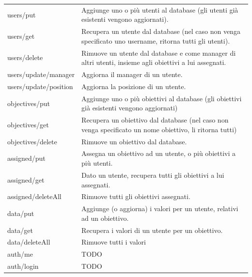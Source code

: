 \begin{table}[]
    \begin{tabular}{ll}
    users/put             & Aggiunge uno o più utenti al database (gli utenti già esistenti vengono aggiornati).                     \\
    users/get             & Recupera un utente dal database (nel caso non venga specificato uno username, ritorna tutti gli utenti). \\
    users/delete          & Rimuove un utente dal database e come manager di altri utenti, insieme agli obiettivi a lui assegnati.   \\
    users/update/manager  & Aggiorna il manager di un utente.                                                                        \\
    users/update/position & Aggiorna la posizione di un utente.                                                                      \\
    objectives/put        & Aggiunge uno o più obiettivi al database (gli obiettivi già esistenti vengono aggiornati)                \\
    objectives/get        & Recupera un obiettivo dal database (nel caso non venga specificato un nome obiettivo, li ritorna tutti)  \\
    objectives/delete     & Rimuove un obiettivo dal database.                                                                       \\
    assigned/put          & Assegna un obiettivo ad un utente, o più obiettivi a più utenti.                                         \\
    assigned/get          & Dato un utente, recupera tutti gli obiettivi a lui assegnati.                                            \\
    assigned/deleteAll    & Rimuove tutti gli obiettivi assegnati.                                                                   \\
    data/put              & Aggiunge (o aggiorna) i valori per un utente, relativi ad un obiettivo.                                  \\
    data/get              & Recupera i valori di un utente per un obiettivo.                                                         \\
    data/deleteAll        & Rimuove tutti i valori                                                                                   \\
    auth/me               & TODO                                                                                                     \\
    auth/login            & TODO                                                                                                    
    \end{tabular}
\end{table}
